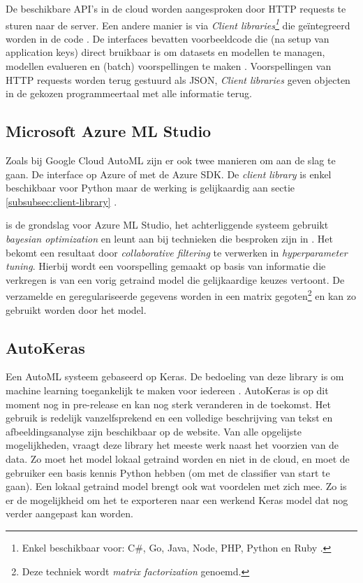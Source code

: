 De beschikbare API's in de cloud worden aangesproken door HTTP requests te sturen naar de server. Een andere manier is via \textit{Client libraries\footnote{Enkel beschikbaar voor: C\#, Go, Java, Node, PHP, Python en Ruby \autocite{GoogleCLV2020}.}} die geïntegreerd worden in de code \autocite{GoogleCL2020}. De interfaces bevatten voorbeeldcode die (na setup van application keys) direct bruikbaar is om datasets en modellen te managen, modellen evalueren en (batch) voorspellingen te maken \autocite{GoogleCLV2020}. Voorspellingen van HTTP requests worden terug gestuurd als JSON, \textit{Client libraries} geven objecten in de gekozen programmeertaal met alle informatie terug.

\subsection{Microsoft Azure ML Studio}
\label{subsec:ml-studio}

Zoals bij Google Cloud AutoML zijn er ook twee manieren om aan de slag te gaan. De interface op Azure of met de Azure SDK. De \textit{client library} is enkel beschikbaar voor Python maar de werking is gelijkaardig aan sectie \ref{subsubsec:client-library} \autocite{Microsoft2020}.

\textcite{fusi2017} is de grondslag voor Azure ML Studio, het achterliggende systeem gebruikt \textit{bayesian optimization} en leunt aan bij technieken die besproken zijn in \textcite{Feurer2015}. Het bekomt een resultaat door \textit{collaborative filtering} te verwerken in \textit{hyperparameter tuning}. Hierbij wordt een voorspelling gemaakt op basis van informatie die verkregen is van een vorig getraind model die gelijkaardige keuzes vertoont. De verzamelde en geregulariseerde gegevens worden in een matrix gegoten\footnote{Deze techniek wordt \textit{matrix factorization} genoemd.} en kan zo gebruikt worden door het model.

\subsection{AutoKeras}
\label{subsec:autokeras}

Een AutoML systeem gebaseerd op Keras. De bedoeling van deze library is om machine learning toegankelijk te maken voor iedereen \autocite{jin2019}. AutoKeras is op dit moment nog in pre-release en kan nog sterk veranderen in de toekomst. Het gebruik is redelijk vanzelfsprekend en een volledige beschrijving van tekst en afbeeldingsanalyse zijn beschikbaar op de website. Van alle opgelijste mogelijkheden, vraagt deze library het meeste werk naast het voorzien van de data. Zo moet het model lokaal getraind worden en niet in de cloud, en moet de gebruiker een basis kennis Python hebben (om met de classifier van start te gaan). Een lokaal getraind model brengt ook wat voordelen met zich mee. Zo is er de mogelijkheid om het te exporteren naar een werkend Keras model dat nog verder aangepast kan worden. 

